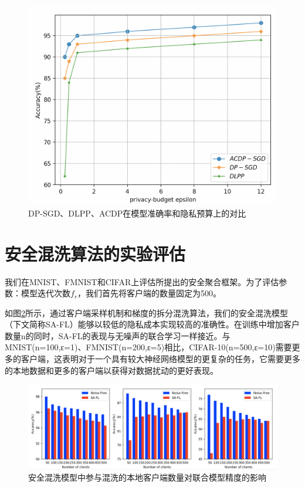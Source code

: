 \begin{figure}[!hbt]
\centering
  	\includegraphics[scale=0.3]{fig2/C5/自适应干扰实验对比}%
	\caption{DP-SGD、DLPP、ACDP在模型准确率和隐私预算上的对比}
  	\label{fig:DP-SGD、DLPP、ACDP在模型准确率和隐私预算上的对比} 
\end{figure}


\section{安全混洗算法的实验评估}
我们在MNIST、FMNIST和CIFAR上评估所提出的安全聚合框架。为了评估参数：模型迭代次数$f_{r}$，我们首先将客户端的数量固定为500。

如图\ref{fig:安全混洗模型中参与混洗的本地客户端数量对联合模型精度的影响}所示，通过客户端采样机制和梯度的拆分混洗算法，我们的安全混洗模型（下文简称SA-FL）能够以较低的隐私成本实现较高的准确性。在训练中增加客户数量n的同时，SA-FL的表现与无噪声的联合学习一样接近。与MNIST(n=100,ε=1)、FMNIST(n=200,ε=5)相比，CIFAR-10(n=500,ε=10)需要更多的客户端，这表明对于一个具有较大神经网络模型的更复杂的任务，它需要更多的本地数据和更多的客户端以获得对数据扰动的更好表现。

\begin{figure}[!hbt]
\centering
  	\includegraphics[scale=0.3]{fig2/C5/SA-FL}%
	\caption{安全混洗模型中参与混洗的本地客户端数量对联合模型精度的影响}
  	\label{fig:安全混洗模型中参与混洗的本地客户端数量对联合模型精度的影响} 
\end{figure}

